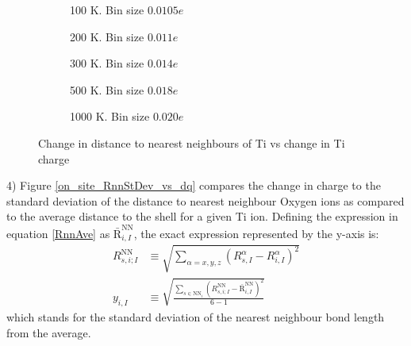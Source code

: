 \documentclass[11pt, a4paper]{report}
\begin{document}
\begin{figure}[h!]
\centering
	\begin{subfigure}[b]{0.45\textwidth}
	\hspace*{-0.4cm}
	
	\vspace*{-0.4cm}
	\caption{100 K. Bin size $0.0105e$}
	\end{subfigure}
	\hspace{0.6cm}
	\begin{subfigure}[b]{0.45\textwidth}
	\hspace*{-0.4cm}
	
	\vspace*{-0.4cm}
	\caption{200 K. Bin size $0.011e$}
	\end{subfigure}
	\quad
	\begin{subfigure}[b]{0.45\textwidth}
	\hspace*{-0.4cm}
	
    \vspace*{-0.4cm}
	\caption{300 K. Bin size $0.014e$}
	\end{subfigure}
	\hspace{0.6cm}
	\begin{subfigure}[b]{0.45\textwidth}
	\hspace*{-0.4cm}
	
    \vspace*{-0.4cm}
	\caption{500 K. Bin size $0.018e$}
	\end{subfigure}
	\quad
	\begin{subfigure}[b]{0.45\textwidth}
	\hspace*{-0.4cm}
	
    \vspace*{-0.4cm}
	\caption{1000 K. Bin size $0.020e$}
	\end{subfigure}
\caption{Change in distance to nearest neighbours of Ti vs change in Ti charge}
\label{on_site_RnnNorm_vs_dq}
\end{figure}

4) Figure \ref{on_site_RnnStDev_vs_dq} compares the change in charge to the standard deviation of the distance to nearest neighbour Oxygen ions as compared to the average distance to the shell for a given Ti ion. Defining the expression in equation \ref{RnnAve} as $\bar{\text{R}}^{\text{NN}}_{i,I}$, the exact expression represented by the y-axis is:
\begin{align*}
R^{\text{NN}}_{s,i;I} &\equiv \sqrt{\sum_{\alpha = x,y,z}\left(R_{s,I}^{\alpha}-R_{i,I}^{\alpha}\right)^2} \\
y_{i,I} &\equiv \sqrt{\frac{\sum_{s\in \text{NN}_i}\left(R^{\text{NN}}_{s,i;I} - \bar{\text{R}}^{\text{NN}}_{i,I} \right)^2}{6-1}}
\end{align*}
which stands for the standard deviation of the nearest neighbour bond length from the average. 
\end{document}
